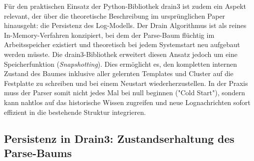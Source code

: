 Für den praktischen Einsatz der Python-Bibliothek drain3 ist zudem ein Aspekt relevant, der über die theoretische Beschreibung im ursprünglichen Paper hinausgeht: die Persistenz des Log-Modells. Der Drain Algorithmus ist als reines In-Memory-Verfahren konzipiert, bei dem der Parse-Baum flüchtig im Arbeitsspeicher existiert und theoretisch bei jedem Systemstart neu aufgebaut werden müsste. Die drain3-Bibliothek erweitert diesen Ansatz jedoch um eine Speicherfunktion (\textit{Snapshotting}). Dies ermöglicht es, den kompletten internen Zustand des Baumes inklusive aller gelernten Templates und Cluster auf die Festplatte zu schreiben und bei einem Neustart wiederherzustellen. In der Praxis muss der Parser somit nicht jedes Mal bei null beginnen ("Cold Start"), sondern kann nahtlos auf das historische Wissen zugreifen und neue Lognachrichten sofort effizient in die bestehende Struktur integrieren.

\subsection{Persistenz in Drain3: Zustandserhaltung des Parse-Baums}
\label{sec:drain3_persistenz}

